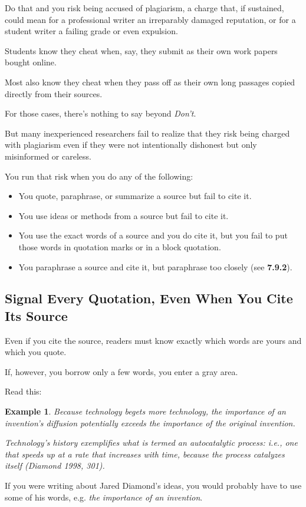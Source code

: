 \documentclass[oneside]{book}
\numberwithin{equation}{section}
\newtheorem{example}{Example}[section]
\begin{document}
Do that and you risk being accused of plagiarism, a charge that, if sustained, could mean for a professional writer an irreparably damaged reputation, or for a student writer a failing grade or even expulsion.

%
Students know they cheat when, say, they submit as their own work papers bought online.

Most also know they cheat when they pass off as their own long passages copied directly from their sources.

For those cases, there's nothing to say beyond \textit{Don't}.

%
But many inexperienced researchers fail to realize that they risk being charged with plagiarism even if they were not intentionally dishonest but only misinformed or careless.

You run that risk when you do any of the following:
\begin{itemize}
    \item You quote, paraphrase, or summarize a source but fail to cite it.
    \item You use ideas or methods from a source but fail to cite it.
    \item You use the exact words of a source and you do cite it, but you fail to put those words in quotation marks or in a block quotation.
    \item You paraphrase a source and cite it, but paraphrase too closely (see \textbf{7.9.2}).
\end{itemize}

\subsection{Signal Every Quotation, Even When You Cite Its Source}
Even if you cite the source, readers must know exactly which words are yours and which you quote.

If, however, you borrow only a few words, you enter a gray area.

Read this:
\begin{example}
    Because technology begets more technology, the importance of an invention's diffusion potentially exceeds the importance of the original invention.
    
    Technology's history exemplifies what is termed an autocatalytic process: i.e., one that speeds up at a rate that increases with time, because the process catalyzes itself (Diamond 1998, 301).
\end{example}
If you were writing about Jared Diamond's ideas, you would probably have to use some of his words, e.g. \textit{the importance of an invention}.
\end{document}
